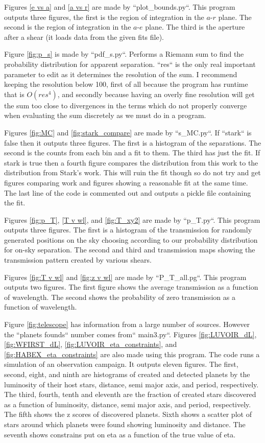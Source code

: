\documentclass{article}
\begin{document}
	Figures \ref{e vs a} and \ref{a vs r} are made by ``plot\_bounds.py``. This program outputs three figures, the first is the region of integration in the $a$-$r$ plane. The second is the region of integration in the $a$-$e$ plane. The third is the aperture after a shear (it loads data from the given fits file).
	
	Figure \ref{fig:p_s} is made by ``pdf\_s.py``. Performs a Riemann sum to find the probability distribution for apparent separation. ``res`` is the only real important parameter to edit as it determines the resolution of the sum. I recommend keeping the resolution below 100, first of all because the program has runtime that is $O(res^4)$, and secondly because having an overly fine resolution will get the sum too close to divergences in the terms which do not properly converge when evaluating the sum discretely as we must do in a program. 
	
	Figures \ref{fig:MC} and \ref{fig:stark_compare} are made by ``s\_MC.py``. If ``stark`` is false then it outputs three figures. The first is a histogram of the separations. The second is the counts from each bin and a fit to them. The third has just the fit. If stark is true then a fourth figure compares the distribution from this work to the distribution from Stark's work. This will ruin the fit though so do not try and get figures comparing work and figures showing a reasonable fit at the same time. The last line of the code is commented out and outputs a pickle file containing the fit. 
	
	Figures \ref{fig:p_T}, \ref{T v wl}, and \ref{fig:T_xy2} are made by ``p\_T.py``. This program outputs three figures. The first is a histogram of the transmission for randomly generated positions on the sky choosing according to our probability distribution for on-sky separation. The second and third and transmission maps showing the transmission pattern created by various shears. 
	
	Figures \ref{fig:T v wl} and \ref{fig:z v wl} are made by ``P\_T\_all.pg``. This program outputs two figures. The first figure shows the average transmission as a function of wavelength. The second shows the probability of zero transmission as a function of wavelength.
	
	Figure \ref{fig:telescope} has information from a large number of sources. However the ``planets founds`` number comes from`` main3.py``. Figures \ref{fig:LUVOIR_dL}, \ref{fig:WFIRST_dL}, \ref{fig:LUVOIR_eta_constraints}, and \ref{fig:HABEX_eta_constraints} are also made using this program. The code runs a simulation of an observation campaign. It outputs eleven figures. The first, second, eight, and ninth are histograms of created and detected planets by the luminosity of their host stars, distance, semi major axis, and period, respectively. The third, fourth, tenth and eleventh are the fraction of created stars discovered as a function of luminosity, distance, semi major axis, and period, respectively. The fifth shows the z scores of discovered planets. Sixth shows a scatter plot of stars around which planets were found showing luminosity and distance. The seventh shows constrains put on eta as a function of the true value of eta.
	
\end{document}
